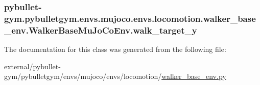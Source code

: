 \subsubsection[{\texorpdfstring{walk\+\_\+target\+\_\+y}{walk_target_y}}]{\setlength{\rightskip}{0pt plus 5cm}pybullet-\/gym.\+pybulletgym.\+envs.\+mujoco.\+envs.\+locomotion.\+walker\+\_\+base\+\_\+env.\+Walker\+Base\+Mu\+Jo\+Co\+Env.\+walk\+\_\+target\+\_\+y}\hypertarget{classpybullet-gym_1_1pybulletgym_1_1envs_1_1mujoco_1_1envs_1_1locomotion_1_1walker__base__env_1_1_walker_base_mu_jo_co_env_ac69a004ccc19fbccc89ce6d5063a6555}{}\label{classpybullet-gym_1_1pybulletgym_1_1envs_1_1mujoco_1_1envs_1_1locomotion_1_1walker__base__env_1_1_walker_base_mu_jo_co_env_ac69a004ccc19fbccc89ce6d5063a6555}


The documentation for this class was generated from the following file\+:\begin{DoxyCompactItemize}
\item 
external/pybullet-\/gym/pybulletgym/envs/mujoco/envs/locomotion/\hyperlink{mujoco_2envs_2locomotion_2walker__base__env_8py}{walker\+\_\+base\+\_\+env.\+py}\end{DoxyCompactItemize}
